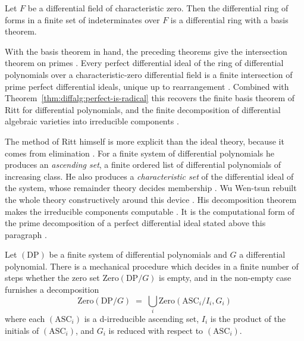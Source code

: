 \begin{theorem}\label{thm:diffalg:ritt-raudenbush-basis}
Let $F$ be a differential field of characteristic zero. Then the
differential ring of forms in a finite set of indeterminates over $F$ is
a differential ring with a basis theorem.
\end{theorem}

With the basis theorem in hand, the preceding theorems give the
intersection theorem on primes
\cite[Theorems~5, 6 and~7, pp.~365--367]{Raudenbush1934}. Every perfect
differential ideal of the ring of differential polynomials over a
characteristic-zero differential field is a finite intersection of prime
perfect differential ideals, unique up to rearrangement
\cite[Theorems~5, 6 and~7, pp.~365--367]{Raudenbush1934}. Combined with
Theorem~\ref{thm:diffalg:perfect-is-radical} this recovers the finite
basis theorem of Ritt for differential polynomials, and the finite decomposition
of differential algebraic varieties into irreducible components
\cite[p.~361]{Raudenbush1934}.

The method of Ritt himself is more explicit than the ideal theory,
because it
comes from elimination \cite[p.~176]{Wu1987RittConstructive}. For a finite system of differential polynomials he produces an
\emph{ascending set}, a finite ordered list of differential polynomials
of increasing class. He also produces a \emph{characteristic set} of the
differential ideal of the system, whose remainder theory decides membership
\cite[p.~176]{Wu1987RittConstructive}. Wu Wen-tsun rebuilt the whole
theory constructively around this device
\cite[pp.~175--184]{Wu1987RittConstructive}. His decomposition theorem
makes the irreducible components computable
\cite[p.~179]{Wu1987RittConstructive}. It is the computational form of the
prime decomposition of a perfect differential ideal stated above this
paragraph \cite[p.~179]{Wu1987RittConstructive}.

\begin{theorem}\label{thm:diffalg:wu-zero-decomposition}
Let $(\mathrm{DP})$ be a finite system of differential polynomials and
$G$ a differential polynomial. There is a mechanical procedure which
decides in a finite number of steps whether the zero set
$\mathrm{Zero}(\mathrm{DP}/G)$ is empty, and in the non-empty case
furnishes a decomposition
\[
\mathrm{Zero}(\mathrm{DP}/G) \;=\; \bigcup_i
\mathrm{Zero}(\mathrm{ASC}_i / I_i, G_i)
\]
where each $(\mathrm{ASC}_i)$ is a d-irreducible ascending set, $I_i$ is
the product of the initials of $(\mathrm{ASC}_i)$, and $G_i$ is reduced
with respect to $(\mathrm{ASC}_i)$.
\end{theorem}

